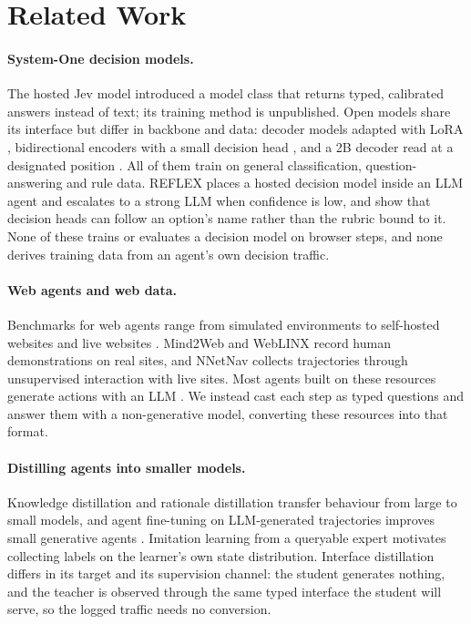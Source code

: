 \documentclass{article}
\begin{document}
\section{Related Work}
\label{sec:related}

\paragraph{System-One decision models.}
The hosted Jev model \citep{typesafe2026jev} introduced a model class that returns typed, calibrated answers instead
of text; its training method is unpublished. Open models share its interface but differ in backbone and data: decoder models adapted with LoRA
\citep{kev2026,hu2022lora}, bidirectional encoders with a small decision head \citep{laya2026,devlin2019bert,warner2024modernbert},
and a 2B decoder read at a designated position \citep{cheng2026thisthat}. All of them train on general classification,
question-answering and rule data. REFLEX \citep{wu2026reflex} places a hosted decision model inside an
LLM agent and escalates to a strong LLM when confidence is low, and \citet{sun2026typesafe} show that decision heads can
follow an option's name rather than the rubric bound to it. None of these trains or evaluates a decision model on
browser steps, and none derives training data from an agent's own decision traffic.

\paragraph{Web agents and web data.}
Benchmarks for web agents range from simulated environments \citep{liu2018miniwob,yao2022webshop} to self-hosted
websites \citep{zhou2024webarena,koh2024visualwebarena} and live websites \citep{he2024webvoyager}. Mind2Web
\citep{deng2023mind2web} and WebLINX \citep{lu2024weblinx} record human demonstrations on real sites, and NNetNav
\citep{murty2024nnetnav} collects trajectories through unsupervised interaction with live sites. Most agents built on
these resources generate actions with an LLM \citep{yao2023react,zheng2024seeact,gur2024realworld}. We instead cast each
step as typed questions and answer them with a non-generative model, converting these resources into that format.

\paragraph{Distilling agents into smaller models.}
Knowledge distillation \citep{hinton2015distilling} and rationale distillation \citep{hsieh2023distilling} transfer
behaviour from large to small models, and agent fine-tuning on LLM-generated trajectories improves small generative
agents \citep{chen2023fireact,zeng2024agenttuning,schick2023toolformer}. Imitation learning from a queryable expert
\citep{ross2011dagger} motivates collecting labels on the learner's own state distribution. Interface distillation
differs in its target and its supervision channel: the student generates nothing, and the teacher is observed through
the same typed interface the student will serve, so the logged traffic needs no conversion.
\end{document}
